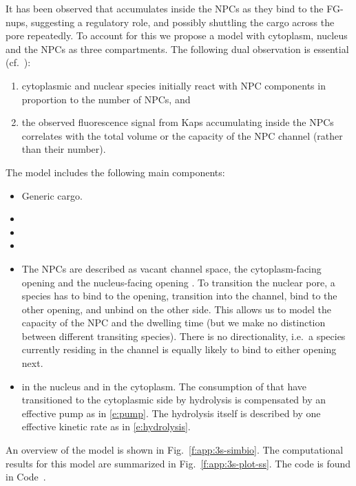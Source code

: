 \documentclass[12pt,notitlepage]{article}
\begin{document}
It has been observed 
that  accumulates 
inside the NPCs
as they bind to the FG-nups,
suggesting a regulatory role,
and
possibly shuttling
the cargo across the pore
repeatedly.
%
%
To account for this
we propose
a model
with cytoplasm, nucleus
and
the NPCs 
as three compartments.
%
%
The following dual observation is essential (cf.~\cite{Hofmeyr2020}):
%
\begin{enumerate}
\item 
	cytoplasmic and nuclear species initially react 
	with NPC components in proportion
	to the number of NPCs,
	and
\item
	the observed fluorescence signal
	from Kaps accumulating inside the NPCs
	correlates with
	the total volume or the capacity of the NPC channel
	(rather than their number).
\end{enumerate}

%
%
%

The model includes the following main components:
\begin{itemize}
\item
	Generic  cargo.
\item 
\item
\item
\item
	The NPCs are described
	as
	vacant  channel space,
	the cytoplasm-facing opening 
	and
	the nucleus-facing opening .
	To transition the nuclear pore,
	a species has to bind to the opening,
	transition into the channel,
	bind to the other opening,
	and unbind on the other side.
	This allows us to model the capacity of the NPC
	and the dwelling time
	(but we make no distinction between different transiting species).
	There is no directionality,
	i.e.~a species currently residing in the channel is equally
	likely to bind to either opening next.
\item
	 in the nucleus and  in the cytoplasm.
	The consumption of 
	that have transitioned to the cytoplasmic side
	by hydrolysis
	is compensated by an effective pump
	as in \eqref{e:pump}.
	The hydrolysis itself is described by one 
	effective kinetic rate as in \eqref{e:hydrolysis}.
\end{itemize}

%

An overview of the model is shown
in Fig.~\ref{f:app:3s-simbio}.
%
The computational results 
for this model 
are summarized in Fig.~\ref{f:app:3s-plot-ss}.
%
%
The code is found in Code~.
\end{document}
